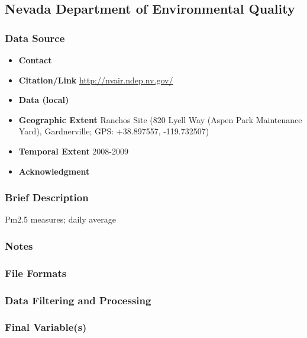 \subsection{Nevada Department of Environmental Quality}

\subsubsection*{Data Source}

\begin{itemize}[nolistsep]
\item \textbf{Contact} 
\item \textbf{Citation/Link} \url{http://nvair.ndep.nv.gov/}
\item \textbf{Data (local)} 
\item \textbf{Geographic Extent} Ranchos Site (820 Lyell Way (Aspen Park Maintenance Yard), Gardnerville; GPS: +38.897557, -119.732507)
\item \textbf{Temporal Extent} 2008-2009
\item \textbf{Acknowledgment} 
\end{itemize}

\subsubsection*{Brief Description}
Pm2.5 measures; daily average

\subsubsection*{Notes}

\subsubsection*{File Formats} 

\subsubsection*{Data Filtering and Processing}

\subsubsection*{Final Variable(s)}

